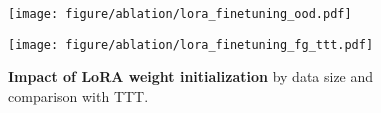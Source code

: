 \begin{figure}[t]
  \centering
    \begin{minipage}{0.49\linewidth}
        \centering
        \texttt{[image: figure/ablation/lora\_finetuning\_ood.pdf]}
        \label{fig:init_ood}
    \end{minipage}
    \hfill
    \begin{minipage}{0.49\linewidth}
        \centering
        \texttt{[image: figure/ablation/lora\_finetuning\_fg\_ttt.pdf]}
        \label{fig:init_fg}
    \end{minipage}
    \caption{\textbf{Impact of LoRA weight initialization} by data size and comparison with TTT.}
    \label{fig:init}
\end{figure}
